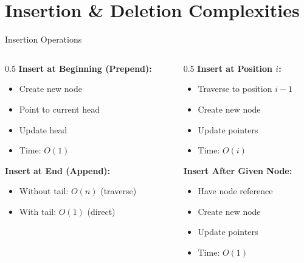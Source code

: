 \documentclass[aspectratio=169,xcolor=dvipsnames]{beamer}
\begin{document}
\section{Insertion \& Deletion Complexities}

\begin{frame}{Insertion Operations}
  \begin{columns}
    \begin{column}{0.5\textwidth}
      \textbf{Insert at Beginning (Prepend):}
      \begin{itemize}
        \item Create new node
        \item Point to current head
        \item Update head
        \item Time: $O(1)$
      \end{itemize}

      \vspace{0.3cm}
      \textbf{Insert at End (Append):}
      \begin{itemize}
        \item Without tail: $O(n)$ (traverse)
        \item With tail: $O(1)$ (direct)
      \end{itemize}
    \end{column}

    \begin{column}{0.5\textwidth}
      \textbf{Insert at Position $i$:}
      \begin{itemize}
        \item Traverse to position $i-1$
        \item Create new node
        \item Update pointers
        \item Time: $O(i)$
      \end{itemize}

      \vspace{0.3cm}
      \textbf{Insert After Given Node:}
      \begin{itemize}
        \item Have node reference
        \item Create new node
        \item Update pointers
        \item Time: $O(1)$
      \end{itemize}
    \end{column}
  \end{columns}
\end{frame}
\end{document}
